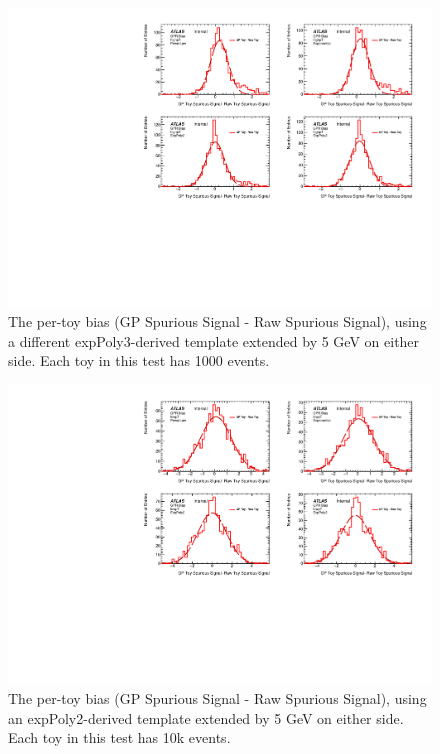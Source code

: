 \begin{figure} 
\begin{center}
  \includegraphics[width=\textwidth]{figures/background/gpr/validation/padded/ToyTest_FitSigBiases_highpT_1000_noSig}   
\caption{The per-toy bias (GP Spurious Signal - Raw Spurious Signal), using a different expPoly3-derived template extended by 5 GeV on either side. Each toy in this test has 1000 events.}
\label{fig:bias_padded_highpt_1000_noSig}
\end{center}
\end{figure}

\begin{figure} 
\begin{center}
  \includegraphics[width=\textwidth]{figures/background/gpr/validation/padded/ToyTest_FitSigBiases_lowpT_10k_noSig}   
\caption{The per-toy bias (GP Spurious Signal - Raw Spurious Signal), using an expPoly2-derived template extended by 5 GeV on either side. Each toy in this test has 10k events.}
\label{fig:bias_padded_lowpt_10k_noSig}
\end{center}
\end{figure}

